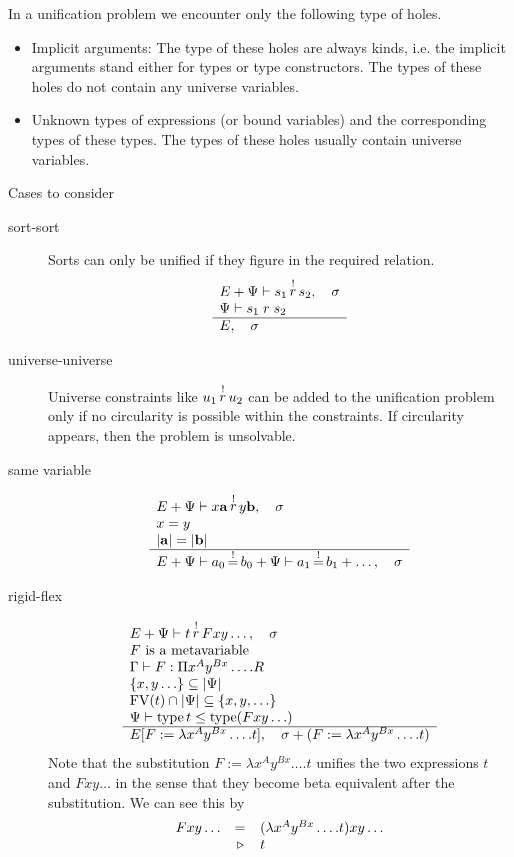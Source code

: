 In a unification problem we encounter only the following type of holes.
\begin{itemize}

\item Implicit arguments: The type of these holes are always kinds, i.e. the
implicit arguments stand either for types or type constructors. The types of
these holes do not contain any universe variables.

\item Unknown types of expressions (or bound variables) and the corresponding
types of these types. The types of these holes usually contain universe
variables.

\end{itemize}


Cases to consider
\begin{description}
\item[sort-sort]
Sorts can only be unified if they figure in the required relation.
$$
\begin{array}{l} 
    E + \Psi \vdash s_1 {\,\stackrel{!}{r}\,} s_2, \quad \sigma
    \\
    \Psi \vdash s_1 \mathrel{r} s_2
 \\ \hline 
    E, \quad \sigma
\end{array}
$$

\item[universe-universe] Universe constraints like $u_1 {\,\stackrel{!}{r}\,} u_2$ can be
added to the unification problem only if no circularity is possible within the
constraints. If circularity appears, then the problem is unsolvable.


\item[same variable]
$$
\begin{array}{l} 
    E + \Psi \vdash x \mathbf{a} {\,\stackrel{!}{r}\,} y \mathbf{b}, \quad \sigma
    \\
    x = y
    \\
    |\mathbf{a}| = |\mathbf{b}|
 \\ \hline 
    E + \Psi \vdash a_0 {\,\stackrel{!}{=}\,} b_0 + \Psi \vdash a_1 {\,\stackrel{!}{=}\,} b_1 + \ldots,
    \quad \sigma
\end{array}
$$






\item[rigid-flex]

$$
\begin{array}{l} 
    E + \Psi \vdash t {\,\stackrel{!}{r}\,} F x y \ldots, \quad \sigma
    \\
    \text{$F$ is a metavariable}
    \\
    \Gamma \vdash F: \Pi x^A y^{Bx} \ldots. R
    \\
    \{x, y \ldots\} \subseteq |\Psi|
    \\
    \text{FV}(t) \cap |\Psi| \subseteq \{x,y,\ldots\}
    \\
    \Psi \vdash \text{type}\, t \le \text{type}(F x y \ldots)
 \\ \hline 
    E[F := \lambda x^A y^{Bx}\ldots . t],
    \quad
    \sigma + (F := \lambda x^A y^{Bx}\ldots . t)
\end{array}
$$
%
Note that the substitution $F := \lambda x^A y^{Bx}\ldots . t$ unifies the two
expressions $t$ and $F x y \ldots$ in the sense that they become beta equivalent
after the substitution. We can see this by
$$
\begin{array}{lll}
    F x y \ldots &=& (\lambda x^A y^{Bx}\ldots . t) x y \ldots
    \\
    &{\,\triangleright\,}& t
\end{array}
$$



\end{description}

